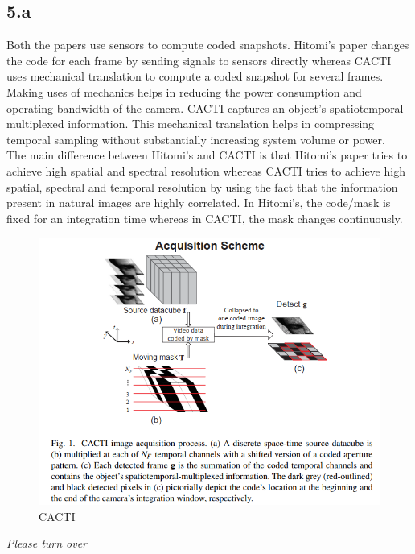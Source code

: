 \documentclass[12pt]{article}
\begin{document}
\subsection*{5.a}
Both the papers use sensors to compute coded snapshots. Hitomi's paper changes the code for each frame by sending signals to sensors directly whereas CACTI uses mechanical translation to compute a coded snapshot for several frames. Making uses of mechanics helps in reducing the power consumption and operating bandwidth of the camera. CACTI captures an object's spatiotemporal-multiplexed information. This mechanical translation helps in compressing temporal sampling without substantially increasing system volume or power. \\
The main difference between Hitomi's and CACTI is that Hitomi's paper tries to achieve  high spatial and spectral resolution whereas CACTI tries to achieve high spatial, spectral and temporal resolution by using the fact that the information present in natural images are highly correlated. In Hitomi's, the code/mask is fixed for an integration time whereas in CACTI, the mask changes continuously.
\begin{figure}[ht]
	\centering
	\includegraphics[scale=0.75]{CACTI.png}
	\caption{CACTI}
\end{figure}
\vspace{2cm}
\begin{center}
	\textit{Please turn over}
\end{center}
\newpage
\end{document}
